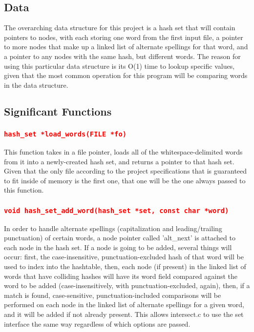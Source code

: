 \documentclass[11pt]{report}
\begin{document}
\subsection*{Data}
The overarching data structure for this project is a hash set that will contain pointers to nodes, with each storing one word from the first input file, a pointer to more nodes that make up a linked list of alternate spellings for that word, and a pointer to any nodes with the same hash, but different words. The reason for using this particular data structure is its O(1) time to lookup specific values, given that the most common operation for this program will be comparing words in the data structure.
\pagebreak
\subsection*{Significant Functions}
\subsubsection*{\texttt{\textcolor{red}{hash\_set *load\_words(FILE *fo)}}}
This function takes in a file pointer, loads all of the whitespace-delimited words from it into a newly-created hash set, and returns a pointer to that hash set. Given that the only file according to the project specifications that is guaranteed to fit inside of memory is the first one, that one will be the one always passed to this function.
\subsubsection*{\texttt{\textcolor{red}{void hash\_set\_add\_word(hash\_set *set, const char *word)}}}
In order to handle alternate spellings (capitalization and leading/trailing punctuation) of certain words, a node pointer called 'alt\_next' is attached to each node in the hash set. If a node is going to be added, several things will occur: first, the case-insensitive, punctuation-excluded hash of that word will be used to index into the hashtable, then, each node (if present) in the linked list of words that have colliding hashes will have its word field compared against the word to be added (case-insensitively, with punctuation-excluded, again), then, if a match is found, case-sensitive, punctuation-included comparisons will be performed on each node in the linked list of alternate spellings for a given word, and it will be added if not already present. This allows intersect.c to use the set interface the same way regardless of which options are passed.
\end{document}
